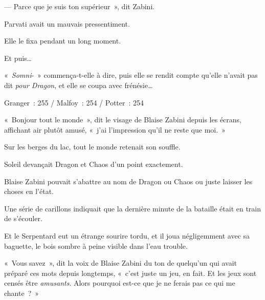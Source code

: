 --- Parce que je suis ton supérieur~», dit Zabini.

Parvati avait un mauvais pressentiment.

Elle le fixa pendant un long moment.

Et puis…

«~\emph{Somni}-~» commença-t-elle à dire, puis elle se rendit compte qu'elle n'avait pas dit \emph{pour Dragon}, et elle se coupa avec frénésie…

\later

Granger~: 255 / Malfoy~: 254 / Potter~: 254

«~Bonjour tout le monde~», dit le visage de Blaise Zabini depuis les écrans, affichant air plutôt amusé, «~j'ai l'impression qu'il ne reste que moi.~»

Sur les berges du lac, tout le monde retenait son souffle.

Soleil devançait Dragon et Chaos d'un point exactement.

Blaise Zabini pouvait s'abattre au nom de Dragon ou Chaos ou juste laisser les choses en l'état.

Une série de carillons indiquait que la dernière minute de la bataille était en train de s'écouler.

Et le Serpentard eut un étrange sourire tordu, et il joua négligemment avec sa baguette, le bois sombre à peine visible dans l'eau trouble.

«~Vous savez~», dit la voix de Blaise Zabini du ton de quelqu'un qui avait préparé ces mots depuis longtemps, «~c'est juste un jeu, en fait.
Et les jeux sont censés être \emph{amusants}.
Alors pourquoi est-ce que je ne ferais pas ce qui me chante~?~»
